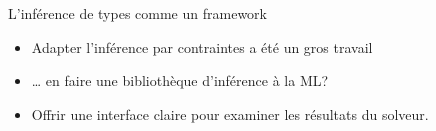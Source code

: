 \documentclass[final]{beamer}
\begin{document}
\begin{frame}{L'inférence de types comme un framework}
  \begin{itemize}
    \item Adapter l'inférence par contraintes a été un gros travail
    \item … en faire une bibliothèque d'inférence à la ML?
    \item Offrir une interface claire pour examiner les résultats du solveur. 
  \end{itemize}
\end{frame}
\end{document}
